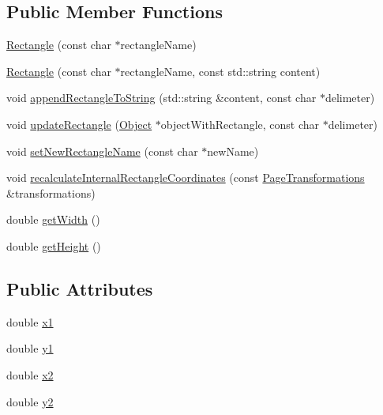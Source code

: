 \subsection*{Public Member Functions}
\begin{DoxyCompactItemize}
\item 
\hyperlink{classmerge__lib_1_1_rectangle_a8e31593fafdc0b14f21d6006fa858ee1}{Rectangle} (const char $\ast$rectangle\-Name)
\item 
\hyperlink{classmerge__lib_1_1_rectangle_a8d7a4548281c2c61b5f60ac9ed407db1}{Rectangle} (const char $\ast$rectangle\-Name, const std\-::string content)
\item 
void \hyperlink{classmerge__lib_1_1_rectangle_afa3ba9cfa8812322bc535ca5e31d924d}{append\-Rectangle\-To\-String} (std\-::string \&content, const char $\ast$delimeter)
\item 
void \hyperlink{classmerge__lib_1_1_rectangle_aae4dc8f5494c96f19cde0771122a9267}{update\-Rectangle} (\hyperlink{classmerge__lib_1_1_object}{Object} $\ast$object\-With\-Rectangle, const char $\ast$delimeter)
\item 
void \hyperlink{classmerge__lib_1_1_rectangle_aae2dd63872fe279fcbf13e7d6a7d3952}{set\-New\-Rectangle\-Name} (const char $\ast$new\-Name)
\item 
void \hyperlink{classmerge__lib_1_1_rectangle_a395b14c81be2add7783e1393be9d311a}{recalculate\-Internal\-Rectangle\-Coordinates} (const \hyperlink{namespacemerge__lib_abbc56c33e072a8c7b4494d50942a06a4}{Page\-Transformations} \&transformations)
\item 
double \hyperlink{classmerge__lib_1_1_rectangle_a9911b718370d9f9c987c1c5f85379b09}{get\-Width} ()
\item 
double \hyperlink{classmerge__lib_1_1_rectangle_a78c23ebff32769d54b568536d76af7f8}{get\-Height} ()
\end{DoxyCompactItemize}
\subsection*{Public Attributes}
\begin{DoxyCompactItemize}
\item 
double \hyperlink{classmerge__lib_1_1_rectangle_ac2114ba824684a5e571ace001eae7e89}{x1}
\item 
double \hyperlink{classmerge__lib_1_1_rectangle_a2fd7bfb16e5ea70e0a9546b8ce13ff31}{y1}
\item 
double \hyperlink{classmerge__lib_1_1_rectangle_a5f3b6541b34a0f5484cbb78cf1587854}{x2}
\item 
double \hyperlink{classmerge__lib_1_1_rectangle_a29e8913a7de8214057c8eae5045695e5}{y2}
\end{DoxyCompactItemize}


